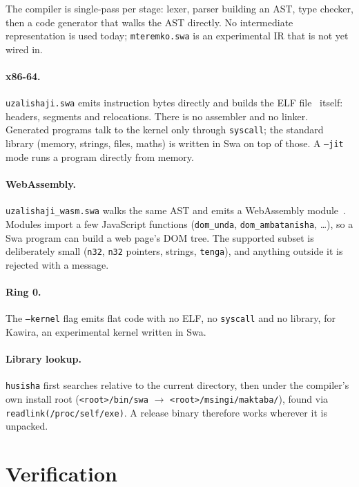 \documentclass[11pt,a4paper]{article}
\begin{document}
The compiler is single-pass per stage: lexer, parser building an AST, type checker, then a code generator that walks the AST directly. No intermediate representation is used today; \texttt{mteremko.swa} is an experimental IR that is not yet wired in.

\paragraph{x86-64.} \texttt{uzalishaji.swa} emits instruction bytes directly and builds the ELF file~\cite{elf} itself: headers, segments and relocations. There is no assembler and no linker. Generated programs talk to the kernel only through \texttt{syscall}; the standard library (memory, strings, files, maths) is written in Swa on top of those. A \texttt{--jit} mode runs a program directly from memory.

\paragraph{WebAssembly.} \texttt{uzalishaji\_wasm.swa} walks the same AST and emits a WebAssembly module~\cite{haas2017}. Modules import a few JavaScript functions (\texttt{dom\_unda}, \texttt{dom\_ambatanisha}, \ldots), so a Swa program can build a web page's DOM tree. The supported subset is deliberately small (\texttt{n32}, \texttt{n32} pointers, strings, \texttt{tenga}), and anything outside it is rejected with a message.

\paragraph{Ring 0.} The \texttt{--kernel} flag emits flat code with no ELF, no \texttt{syscall} and no library, for Kawira, an experimental kernel written in Swa.

\paragraph{Library lookup.} \texttt{husisha} first searches relative to the current directory, then under the compiler's own install root (\texttt{<root>/bin/swa} $\to$ \texttt{<root>/msingi/maktaba/}), found via \texttt{readlink(/proc/self/exe)}. A release binary therefore works wherever it is unpacked.

\section{Verification}\label{sec:uthibitisho}
\end{document}
